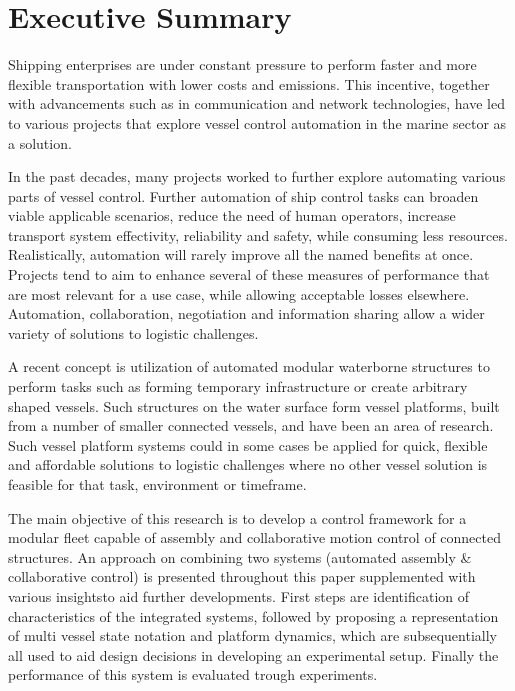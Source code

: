 \chapter{Executive Summary}
Shipping enterprises are under constant pressure to perform faster and more flexible transportation with lower costs and emissions.  This incentive, together with advancements such as in communication and network technologies, have led to various projects that explore vessel control automation in the marine sector as a solution. 

In the past decades, many projects worked to further explore automating various parts of vessel control. Further automation of ship control tasks can broaden viable applicable scenarios, reduce the need of human operators, increase transport system effectivity, reliability and safety, while consuming less resources. Realistically, automation will rarely improve all the named benefits at once. Projects tend to aim to enhance several of these measures of performance that are most relevant for a use case, while allowing acceptable losses elsewhere. Automation, collaboration, negotiation and information sharing allow a wider variety of solutions to logistic challenges.

A recent concept is utilization of automated modular waterborne structures to perform tasks such as forming temporary infrastructure or create arbitrary shaped vessels. Such structures on the water surface form vessel platforms, built from a number of smaller connected vessels, and have  been an area of research. Such vessel platform systems could in some cases be applied  for quick, flexible and affordable solutions to logistic challenges where no other vessel solution is feasible for that task, environment or timeframe. 

The main objective of this research is to develop a control framework for a modular fleet capable of assembly and collaborative motion control of connected structures. An approach on combining two systems (automated assembly \& collaborative control) is presented throughout this paper supplemented with various insightsto aid further developments. First steps are identification of characteristics of the integrated systems, followed by proposing a representation of multi vessel state notation and platform dynamics, which are subsequentially all used to aid design decisions in developing an experimental setup. Finally the performance of this system is evaluated trough experiments. 

